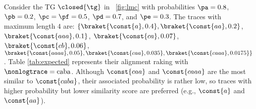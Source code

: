 \begin{table}[!t]
	\vspace{5mm}
	\centering
	\caption{Golden ranking of model traces with maximum length $4$, where $\logtrace=\const{caba}$ and $c=5$.}\label{tab:expected}
\end{table}
\begin{example}\label{ex:rankingTaus}
	Consider the TG $\closed{\tg}$ in \figurename~\ref{fig:lmc} with probabilities
	$\pa=0.8$, $\pb=0.2$, $\pc=\pf=0.5$, $\pd=0.7$, and $\pe=0.3$. The traces with maximum length $4$ are:
	$\{\braket{\const{a},0.4},\braket{\const{aa},0.2}$, $\braket{\const{aaa},0.1}$, $\braket{\const{ca},0.07}$, 
	$\braket{\const{cb},0.06}$,
	$\braket{\const{aaaa},0.05},\braket{\const{caa},0.035},\braket{\const{caaa},0.0175}\}$. 
	Table \ref{tab:expected} represents their alignment raking with  $\nonlogtrace=\textup{caba}$.  Although $\const{caa}$ and 
	$\const{caaa}$ are the most similar to $\const{caba}$, their associated probability  is rather low, so traces with 
	higher probability but lower similarity score are preferred (e.g., $\const{a}$ and $\const{aa}$).
\end{example}
